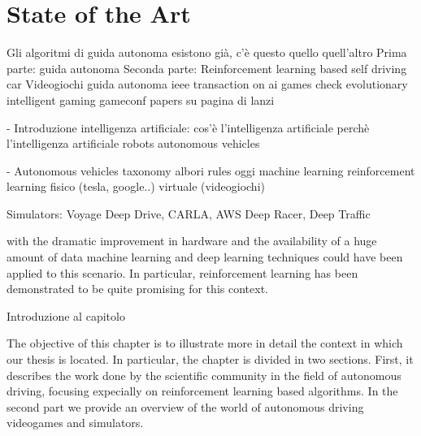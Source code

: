 \chapter{State of the Art}
\label{State of the Art}
\thispagestyle{empty}



Gli algoritmi di guida autonoma esistono già, c'è questo quello quell'altro
	Prima parte: 
		guida autonoma
	Seconda parte:
		Reinforcement learning based self driving car
		Videogiochi guida autonoma
		ieee transaction on ai games
		check evolutionary intelligent gaming
		gameconf
		papers su pagina di lanzi
		
- Introduzione intelligenza artificiale:
	cos'è l'intelligenza artificiale
	perchè l'intelligenza artificiale
	robots
	autonomous vehicles
	
- Autonomous vehicles
	taxonomy
	albori
		rules
	oggi
		machine learning
			reinforcement learning
				fisico (tesla, google..)
				virtuale (videogiochi)
				 
	
	











Simulators: Voyage Deep Drive, CARLA, AWS Deep Racer, Deep Traffic





			


with the dramatic improvement in hardware and the availability of a huge amount of data machine learning and deep learning techniques could have been applied to this scenario. 
In particular, reinforcement learning has been demonstrated to be quite promising for this context.







\cite{playingforbenchmarks}






Introduzione al capitolo


The objective of this chapter is to illustrate more in detail the context in which our thesis is located.
In particular, the chapter is divided in two sections. First, it describes the work done by the scientific community in the field of autonomous driving, focusing expecially on reinforcement learning based algorithms.
In the second part we provide an overview of the world of autonomous driving videogames and simulators.





